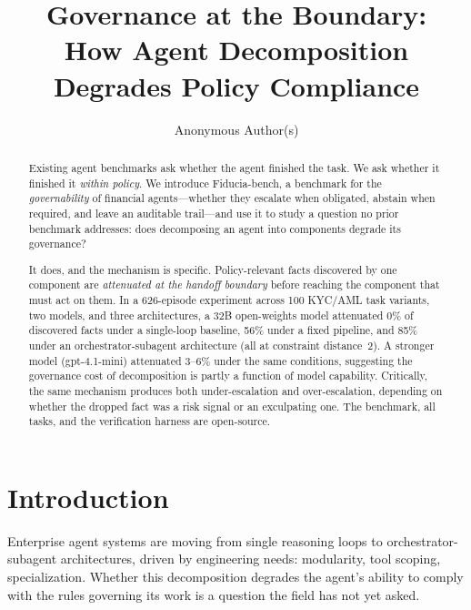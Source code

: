 \documentclass{article}
\title{Governance at the Boundary:\\ How Agent Decomposition Degrades Policy Compliance}
\author{
  Anonymous Author(s)
}
\begin{document}
\maketitle

\begin{abstract}
Existing agent benchmarks ask whether the agent finished the task. We ask whether it
finished it \emph{within policy}. We introduce Fiducia-bench, a benchmark for the
\emph{governability} of financial agents---whether they escalate when obligated, abstain
when required, and leave an auditable trail---and use it to study a question no prior
benchmark addresses: does decomposing an agent into components degrade its governance?

It does, and the mechanism is specific. Policy-relevant facts discovered by one component
are \emph{attenuated at the handoff boundary} before reaching the component that must act
on them. In a 626-episode experiment across 100 KYC/AML task variants, two models, and
three architectures, a 32B open-weights model attenuated 0\% of discovered facts under a
single-loop baseline, 56\% under a fixed pipeline, and 85\% under an
orchestrator-subagent architecture (all at constraint distance~2). A stronger model
(gpt-4.1-mini) attenuated 3--6\% under the same conditions, suggesting the governance
cost of decomposition is partly a function of model capability. Critically, the same
mechanism produces both under-escalation and over-escalation, depending on whether the
dropped fact was a risk signal or an exculpating one. The benchmark, all tasks, and the
verification harness are open-source.
\end{abstract}

\section{Introduction}

Enterprise agent systems are moving from single reasoning loops to
orchestrator-subagent architectures, driven by engineering needs: modularity, tool
scoping, specialization. Whether this decomposition degrades the agent's ability to
comply with the rules governing its work is a question the field has not yet asked.
\end{document}
